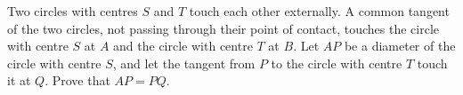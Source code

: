 Two circles with centres $S$ and $T$ touch each other externally. A common tangent of the two circles, not passing through their point of contact, touches the circle with centre $S$ at $A$ and the circle with centre $T$ at $B$. Let $AP$ be a diameter of the circle with centre $S$, and let the tangent from $P$ to the circle with centre $T$ touch it at $Q$. Prove that $AP=PQ$.

